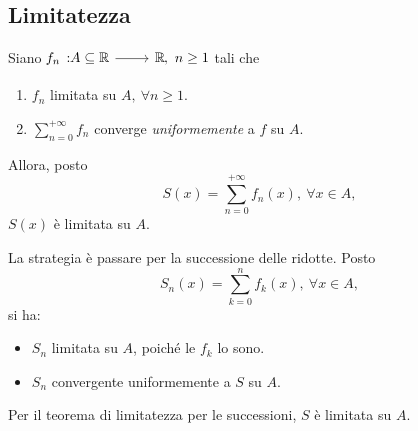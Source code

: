 \subsection{Limitatezza}
\begin{theorema}
	Siano $\displaystyle \funz{f_n}{A\subseteq\realset}{\realset},\ n\geq 1$ tali che
	\begin{enumerate}
		\item $f_n$ limitata su $A,\ \forall n\geq 1$.
		\item $\displaystyle\sum_{n=0}^{+\infty}f_n$ converge \textit{uniformemente} a $f$ su $A$.
	\end{enumerate}
	Allora, posto 
	\begin{equation*}
		S(x)=\sum_{n=0}^{+\infty}f_n(x),\ \forall x\in A,
	\end{equation*}
$S(x)$ è limitata su $A$.
\end{theorema}
\begin{demonstration}
	La strategia è passare per la successione delle ridotte. Posto 
	\begin{equation*}
		S_n(x)=\sum_{k=0}^{n}f_k(x),\ \forall x\in A,
	\end{equation*}
	si ha:
	\begin{itemize}
		\item $S_n$ limitata su $A$, poiché le $f_k$ lo sono.
		\item $S_n$ convergente uniformemente a $S$ su $A$.
	\end{itemize}
	Per il teorema di limitatezza per le successioni, $S$ è limitata su $A$.
\end{demonstration}
